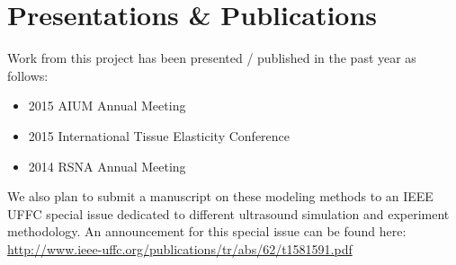 \section{Presentations \& Publications}

Work from this project has been presented / published in the past year as follows:

\begin{itemize}
    \item 2015 AIUM Annual Meeting
    \item 2015 International Tissue Elasticity Conference
    \item 2014 RSNA Annual Meeting
\end{itemize}

We also plan to submit a manuscript on these modeling methods to an IEEE UFFC
special issue dedicated to different ultrasound simulation and experiment
methodology.  An announcement for this special issue can be found here:
\url{http://www.ieee-uffc.org/publications/tr/abs/62/t1581591.pdf}
